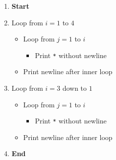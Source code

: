 \begin{enumerate}
    \item \textbf{Start}
    \item Loop from $i = 1$ to $4$
    \begin{itemize}
        \item Loop from $j = 1$ to $i$
        \begin{itemize}
            \item Print \texttt{*} without newline
        \end{itemize}
        \item Print newline after inner loop
    \end{itemize}
    \item Loop from $i = 3$ down to $1$
    \begin{itemize}
        \item Loop from $j = 1$ to $i$
        \begin{itemize}
            \item Print \texttt{*} without newline
        \end{itemize}
        \item Print newline after inner loop
    \end{itemize}
    \item \textbf{End}
\end{enumerate}
